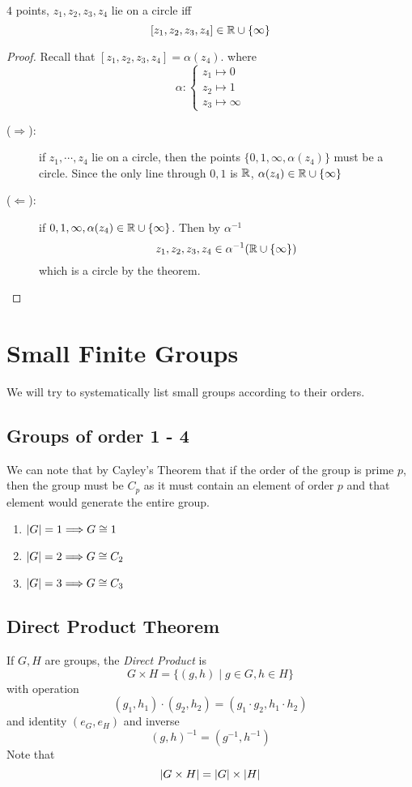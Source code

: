 \documentclass{article}
\begin{document}
\begin{cor}
    $4$ points, $z_1, z_2, z_3, z_4$ lie on a circle iff
    \[
        [z_1, z_2, z_3, z_4] \in \mathbb{R} \cup \{\infty\}  
    \]
\end{cor}
\begin{proof}
    Recall that $[z_1, z_2, z_3, z_4] = \alpha(z_4)$. where
    \[
        \alpha: \begin{cases}
            z_1 \mapsto 0 \\
            z_2 \mapsto 1 \\
            z_3 \mapsto \infty
        \end{cases}    
    \]
    \begin{description}
        \item[($\Longrightarrow$):] if $z_1, \cdots, z_4$ lie on a circle, then the points $\{0, 1, \infty, \alpha(z_4)\}$ must be a circle.
        Since the only line through $0, 1$ is $\mathbb{R}$, $\alpha(z_4) \in \mathbb{R} \cup \{ \infty \}$
         
        \item[($\Longleftarrow$):] if $0, 1, \infty, \alpha(z_4) \in \mathbb{R} \cup \{\infty\}$. Then by $\alpha^{-1}$
        \[
            z_1, z_2, z_3, z_4 \in \alpha^{-1}(\mathbb{R} \cup \{ \infty \})   
        \]
        which is a circle by the theorem.
    \end{description}
\end{proof}

\section{Small Finite Groups}
We will try to systematically list small groups according to their orders.

\subsection{Groups of order 1 - 4}
We can note that by Cayley's Theorem that if the order of the group is prime $p$, then the group must be $C_p$ as it must contain an element of order $p$ and that element would generate the entire group.
\begin{enumerate}
    \item $\left\lvert G\right\rvert = 1 \Longrightarrow G \cong 1$
    \item $\left\lvert G\right\rvert = 2 \Longrightarrow G \cong C_2$
    \item $\left\lvert G\right\rvert = 3 \Longrightarrow G \cong C_3$
\end{enumerate}
\subsection{Direct Product Theorem}
\begin{defi}
    If $G, H$ are groups, the \emph{Direct Product} is
    \[
        G \times H = \{(g,  h) \mid g \in G, h \in H\}  
    \]
    with operation
    \[
        (g_1, h_1) \cdot (g_2, h_2) = (g_1 \cdot g_2, h_1 \cdot h_2)    
    \]
    and identity $(e_G, e_H)$ and inverse
    \[
        (g, h)^{-1} = (g^{-1}, h^{-1})     
    \]
    Note that
    \[
        \left\lvert G \times H\right\rvert = \left\lvert G\right\rvert \times \left\lvert H\right\rvert  
    \]
\end{defi}
\end{document}
